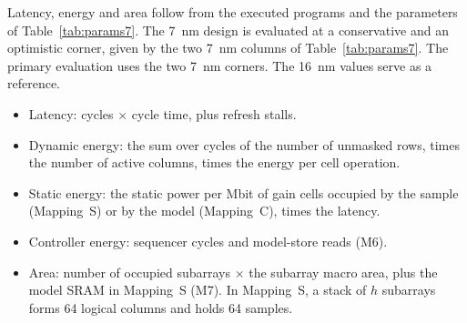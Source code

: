 \documentclass[preprint,review,12pt]{elsarticle}
\begin{document}
Latency, energy and area follow from the executed programs and the parameters of Table~\ref{tab:params7}. The 7~nm design is evaluated at a conservative and an optimistic corner, given by the two 7~nm columns of Table~\ref{tab:params7}.
The primary evaluation uses the two 7~nm corners. The 16~nm values serve as a reference.
\begin{itemize}
\item Latency: cycles $\times$ cycle time, plus refresh stalls.
\item Dynamic energy: the sum over cycles of the number of unmasked rows, times the number of active columns, times the energy per cell operation.
\item Static energy: the static power per Mbit of gain cells occupied by the sample (Mapping~S) or by the model (Mapping~C), times the latency.
\item Controller energy: sequencer cycles and model-store reads (M6).
\item Area: number of occupied subarrays $\times$ the subarray macro area, plus the model SRAM in Mapping~S (M7). In Mapping~S, a stack of $h$ subarrays forms 64 logical columns and holds 64 samples.
\end{itemize}
\end{document}
